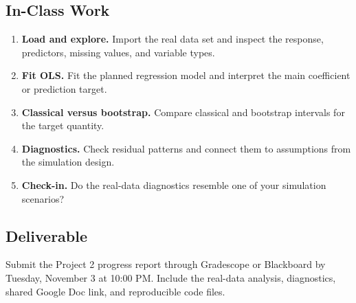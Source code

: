 \documentclass{article}
\newcommand{\submissionplatform}{Gradescope or Blackboard}
\newcommand{\duedate}{Tuesday, November 3 at 10:00 PM}
\begin{document}
\subsection*{In-Class Work}
\begin{enumerate}[label={\bfseries (\Alph*)},itemsep=.5em]
  \item \textbf{Load and explore.} Import the real data set and inspect the response, predictors, missing values, and variable types.
  \item \textbf{Fit OLS.} Fit the planned regression model and interpret the main coefficient or prediction target.
  \item \textbf{Classical versus bootstrap.} Compare classical and bootstrap intervals for the target quantity.
  \item \textbf{Diagnostics.} Check residual patterns and connect them to assumptions from the simulation design.
  \item \textbf{Check-in.} Do the real-data diagnostics resemble one of your simulation scenarios?
\end{enumerate}

\subsection*{Deliverable}
Submit the Project 2 progress report through \submissionplatform{} by \duedate{}. Include the real-data analysis, diagnostics, shared Google Doc link, and reproducible code files.
\end{document}
